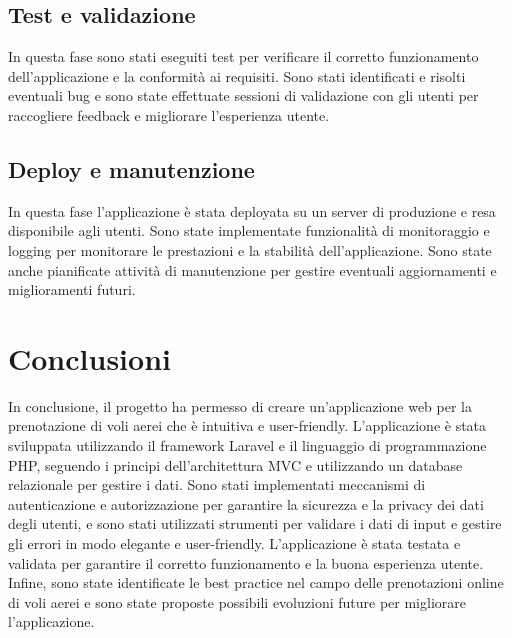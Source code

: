 \documentclass{article}
\begin{document}
\subsection{Test e validazione}

In questa fase sono stati eseguiti test per verificare il corretto funzionamento dell'applicazione e la conformità ai requisiti. Sono stati identificati e risolti eventuali bug e sono state effettuate sessioni di validazione con gli utenti per raccogliere feedback e migliorare l'esperienza utente.
\subsection{Deploy e manutenzione}

In questa fase l'applicazione è stata deployata su un server di produzione e resa disponibile agli utenti. Sono state implementate funzionalità di monitoraggio e logging per monitorare le prestazioni e la stabilità dell'applicazione. Sono state anche pianificate attività di manutenzione per gestire eventuali aggiornamenti e miglioramenti futuri.



\section{Conclusioni}
In conclusione, il progetto ha permesso di creare un'applicazione web per la prenotazione di voli aerei che è intuitiva e user-friendly. L'applicazione è stata sviluppata utilizzando il framework Laravel e il linguaggio di programmazione PHP, seguendo i principi dell'architettura MVC e utilizzando un database relazionale per gestire i dati. Sono stati implementati meccanismi di autenticazione e autorizzazione per garantire la sicurezza e la privacy dei dati degli utenti, e sono stati utilizzati strumenti per validare i dati di input e gestire gli errori in modo elegante e user-friendly. L'applicazione è stata testata e validata per garantire il corretto funzionamento e la buona esperienza utente. Infine, sono state identificate le best practice nel campo delle prenotazioni online di voli aerei e sono state proposte possibili evoluzioni future per migliorare l'applicazione.
{}

\end{document}
